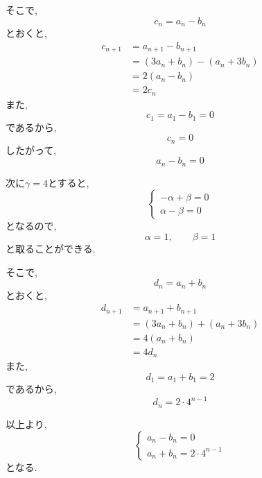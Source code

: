 \begin{enumerate}[label=(\arabic*),parsep=3pt,format=\bookitemlink{example-system-1}{solution}{problem}]
\begin{enumerate}
                  そこで,
                  \[
                    c_n=a_n-b_n
                  \]
                  とおくと,
                  \begin{align*}
                    c_{n+1}
                      &=a_{n+1}-b_{n+1}\\
                      &=(3a_n+b_n)-(a_n+3b_n)\\
                      &=2(a_n-b_n)\\
                      &=2c_n
                  \end{align*}
                  また,
                  \[
                    c_1=a_1-b_1=0
                  \]
                  であるから,
                  \[
                    c_n=0
                  \]
                  したがって,
                  \[
                    a_n-b_n=0
                  \]

                  次に$\gamma=4$とすると,
                  \[
                  \begin{cases}
                    -\alpha+\beta=0\\
                    \alpha-\beta=0
                  \end{cases}
                  \]
                  となるので,
                  \[
                    \alpha=1,\qquad\beta=1
                  \]
                  と取ることができる.

                  そこで,
                  \[
                    d_n=a_n+b_n
                  \]
                  とおくと,
                  \begin{align*}
                    d_{n+1}
                      &=a_{n+1}+b_{n+1}\\
                      &=(3a_n+b_n)+(a_n+3b_n)\\
                      &=4(a_n+b_n)\\
                      &=4d_n
                  \end{align*}
                  また,
                  \[
                    d_1=a_1+b_1=2
                  \]
                  であるから,
                  \[
                    d_n=2\cdot4^{n-1}
                  \]

                  以上より,
                  \[
                  \begin{cases}
                    a_n-b_n=0\\
                    a_n+b_n=2\cdot4^{n-1}
                  \end{cases}
                  \]
                  となる.


\end{enumerate}
\end{enumerate}
